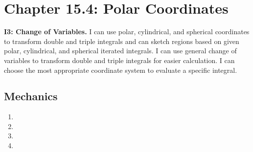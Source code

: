 
\fancyhead[R]{\daysixteen}

\section*{\centering Chapter 15.4: Polar Coordinates}
\textbf{I3: Change of Variables.} I can use polar, cylindrical, and spherical coordinates to transform double and triple integrals and can sketch regions based on given polar, cylindrical, and spherical iterated integrals. I can use general change of variables to transform double and triple integrals for easier calculation.  I can choose the most appropriate coordinate system to evaluate a specific integral.

\subsection*{Mechanics}
\begin{enumerate}
\item {}
        {%
        
        }
        {%
        
        }
    
	\item {}
        {%
        
        }
        {%
        
        }
	
	\item {}
        {%
        
        }
        {%
        
        }
    \item {}
        {%
        
        }
        {%
        
        }
\end{enumerate}
